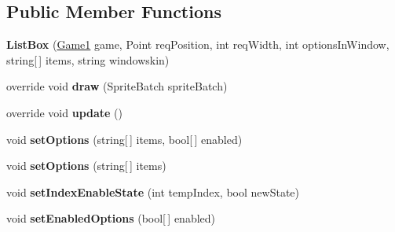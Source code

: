 \subsection*{Public Member Functions}
\begin{DoxyCompactItemize}
\item 
\hypertarget{class_simple_r_p_g_1_1_windows_1_1_list_box_adb75959fbbfaad12d00d92ea25df02fd}{{\bfseries List\-Box} (\hyperlink{class_simple_r_p_g_1_1_game1}{Game1} game, Point req\-Position, int req\-Width, int options\-In\-Window, string\mbox{[}$\,$\mbox{]} items, string windowskin)}\label{class_simple_r_p_g_1_1_windows_1_1_list_box_adb75959fbbfaad12d00d92ea25df02fd}

\item 
\hypertarget{class_simple_r_p_g_1_1_windows_1_1_list_box_a9554b0fc0656571c97d4b633dd63f4c0}{override void {\bfseries draw} (Sprite\-Batch sprite\-Batch)}\label{class_simple_r_p_g_1_1_windows_1_1_list_box_a9554b0fc0656571c97d4b633dd63f4c0}

\item 
\hypertarget{class_simple_r_p_g_1_1_windows_1_1_list_box_ae061189951387436b8d0edc90e667330}{override void {\bfseries update} ()}\label{class_simple_r_p_g_1_1_windows_1_1_list_box_ae061189951387436b8d0edc90e667330}

\item 
\hypertarget{class_simple_r_p_g_1_1_windows_1_1_list_box_a70ee330db8b560653f784c5cadbad07c}{void {\bfseries set\-Options} (string\mbox{[}$\,$\mbox{]} items, bool\mbox{[}$\,$\mbox{]} enabled)}\label{class_simple_r_p_g_1_1_windows_1_1_list_box_a70ee330db8b560653f784c5cadbad07c}

\item 
\hypertarget{class_simple_r_p_g_1_1_windows_1_1_list_box_a3b6d40c01a1c816fc7e72aea2e6d328a}{void {\bfseries set\-Options} (string\mbox{[}$\,$\mbox{]} items)}\label{class_simple_r_p_g_1_1_windows_1_1_list_box_a3b6d40c01a1c816fc7e72aea2e6d328a}

\item 
\hypertarget{class_simple_r_p_g_1_1_windows_1_1_list_box_aa9dd5bf1dc7b9440a12ec386280f50dd}{void {\bfseries set\-Index\-Enable\-State} (int temp\-Index, bool new\-State)}\label{class_simple_r_p_g_1_1_windows_1_1_list_box_aa9dd5bf1dc7b9440a12ec386280f50dd}

\item 
\hypertarget{class_simple_r_p_g_1_1_windows_1_1_list_box_aa7f9529f9103613c7743ea4507da0308}{void {\bfseries set\-Enabled\-Options} (bool\mbox{[}$\,$\mbox{]} enabled)}\label{class_simple_r_p_g_1_1_windows_1_1_list_box_aa7f9529f9103613c7743ea4507da0308}


\end{DoxyCompactItemize}
